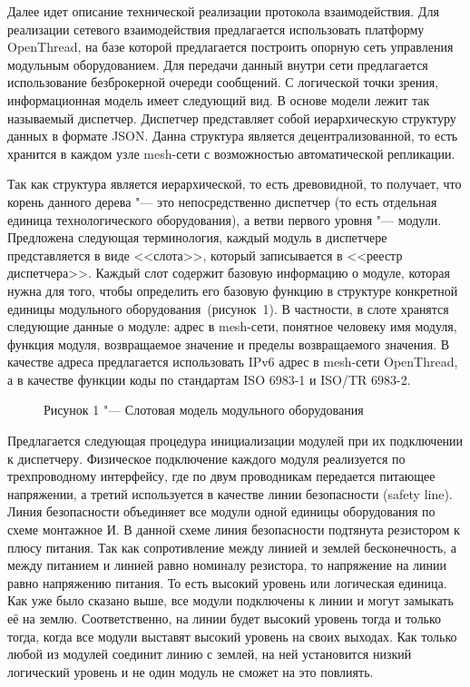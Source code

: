 Далее идет описание технической реализации протокола взаимодействия. Для реализации сетевого взаимодействия предлагается использовать платформу OpenThread, на базе которой предлагается построить опорную сеть управления модульным оборудованием.  Для передачи данный внутри сети предлагается использование безброкерной очереди сообщений. С логической точки зрения, информационная модель имеет следующий вид. В основе модели лежит так называемый диспетчер. Диспетчер представляет собой иерархическую структуру данных в формате JSON. Данна структура является децентрализованной, то есть хранится в каждом узле mesh-сети с возможностью автоматической репликации.

Так как структура является иерархической, то есть древовидной, то получает, что корень данного дерева "--- это непосредственно диспетчер (то есть отдельная единица технологического оборудования), а ветви первого уровня "--- модули. Предложена следующая терминология, каждый модуль в диспетчере представляется в виде <<слота>>, который записывается в <<реестр диспетчера>>. Каждый слот содержит базовую информацию о модуле, которая нужна для того, чтобы определить его базовую функцию в структуре конкретной единицы модульного оборудования~(рисунок~1). В частности, в слоте хранятся следующие данные о модуле: адрес в mesh-сети, понятное человеку имя модуля, функция модуля, возвращаемое значение и пределы возвращаемого значения. В качестве адреса предлагается использовать IPv6 адрес в mesh-сети OpenThread, а в качестве функции коды по стандартам ISO 6983-1 и ISO/TR 6983-2.

\begin{figure}[ht]
	\caption*{Рисунок 1 "--- Слотовая модель модульного оборудования}\label{fig:main-arch}
\end{figure}

Предлагается следующая процедура инициализации модулей при их подключении к диспетчеру. Физическое подключение каждого модуля реализуется по трехпроводному интерфейсу, где по двум проводникам передается питающее напряжении, а третий используется в качестве линии безопасности (safety line). Линия безопасности объединяет все модули одной единицы оборудования по схеме монтажное И. В данной схеме линия безопасности подтянута резистором к плюсу питания. Так как сопротивление между линией и землей бесконечность, а между питанием и линией равно номиналу резистора, то напряжение на линии равно напряжению питания. То есть высокий уровень или логическая единица. Как уже было сказано выше, все модули подключены к линии и могут замыкать её на землю. Соответственно, на линии будет высокий уровень тогда и только тогда, когда все модули выставят высокий уровень на своих выходах. Как только любой из модулей соединит линию с землей, на ней установится низкий логический уровень и не один модуль не сможет на это повлиять.

